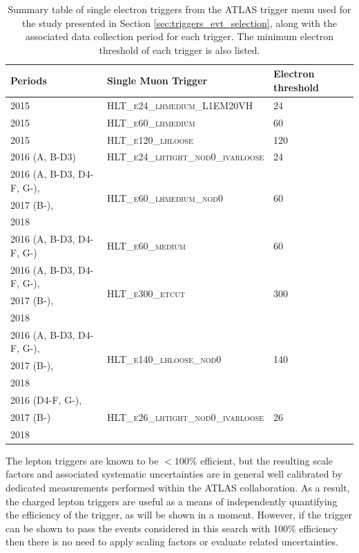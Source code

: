 \begin{table}[ht]
\caption{Summary table of single electron triggers from the ATLAS trigger menu used for the study presented in Section \ref{sec:triggers_evt_selection}, along with the associated data collection period for each trigger. The minimum electron \pt threshold of each trigger is also listed.}
\label{tab:summary_electron_triggers_used}
\footnotesize{
	\begin{center}
	\begin{tabular}{l l l }
		\toprule
			\textbf{Periods} & \textbf{Single Muon Trigger} & \textbf{Electron \pt threshold} \\
			\midrule
			\midrule
			2015 & \textsc{HLT\_e24\_lhmedium\_L1EM20VH} & 24 \GeV \\
			\midrule
			2015 & \textsc{HLT\_e60\_lhmedium} & 60 \GeV \\
			\midrule
			2015 & \textsc{HLT\_e120\_lhloose} & 120 \GeV \\
			\midrule
			2016 (A, B-D3) & \textsc{HLT\_e24\_lhtight\_nod0\_ivarloose} & 24 \GeV \\
			\midrule
			2016 (A, B-D3, D4-F, G-), & \multirow{3}{*}{\textsc{HLT\_e60\_lhmedium\_nod0}} & \multirow{3}{*}{60 \GeV} \\
			2017 (B-), & & \\
			2018 & & \\
			\midrule
			2016 (A, B-D3, D4-F, G-)  & \textsc{HLT\_e60\_medium} & 60 \GeV \\
			\midrule
			2016 (A, B-D3, D4-F, G-),  & \multirow{3}{*}{\textsc{HLT\_e300\_etcut}} & \multirow{3}{*}{300 \GeV} \\
			2017 (B-), & & \\
			2018 \\
			\midrule
			2016 (A, B-D3, D4-F, G-), & \multirow{3}{*}{\textsc{HLT\_e140\_lhloose\_nod0}} & \multirow{3}{*}{140 \GeV} \\
			2017 (B-), & & \\
			2018 & & \\
			\midrule
			2016 (D4-F, G-), & \multirow{3}{*}{\textsc{HLT\_e26\_lhtight\_nod0\_ivarloose}} & \multirow{3}{*}{26 \GeV} \\
			2017 (B-) & & \\
			2018 & & \\
		\bottomrule
	\end{tabular}
	\end{center}
	}
\end{table}

The lepton triggers are known to be \(<100\%\) efficient, but the resulting scale factors and associated systematic uncertainties are in general well calibrated by dedicated measurements performed within the ATLAS collaboration. As a result, the charged lepton triggers are useful as a means of independently quantifying the efficiency of the \met trigger, as will be shown in a moment. However, if the \met trigger can be shown to pass the events considered in this search with 100\% efficiency then there is no need to apply scaling factors or evaluate related uncertainties.

